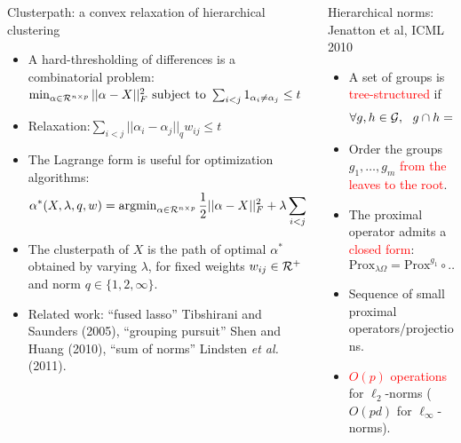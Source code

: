 \documentclass[final]{beamer}
\newcommand{\rred}[1]{{\textcolor{red}{#1}}}
\begin{document}
\begin{frame}{}
\begin{columns}[T]
\begin{column}{0.315\paperwidth}
\begin{block}{Clusterpath: a convex relaxation of hierarchical
    clustering}
\begin{itemize}
\item A hard-thresholding of differences is a combinatorial problem:
$
 \min_{    \alpha\in{\mathcal R}^{n\times p}}       ||\alpha-X||_F^2 \text{  subject to  }
\sum_{i<j}1_{\alpha_i\neq\alpha_j} \leq t$
\item Relaxation:$\sum_{i<j}||\alpha_i-\alpha_j||_q w_{ij}\leq t$
\item The Lagrange form is useful for optimization algorithms:
$$
\alpha^*(X,\lambda,q,w)=\operatorname{argmin}_{\alpha\in{\mathcal R}^{n\times p}}
\frac 1 2||\alpha-X||_F^2+\lambda\sum_{i<j}||\alpha_i-\alpha_j||_q w_{ij}
$$
\item The \alert<1>{clusterpath} of $X$ is the path of optimal
  $\alpha^*$ obtained by varying $\lambda$, for fixed weights
  $w_{ij}\in{\mathcal R}^+$ and norm $q\in\{1,2,\infty\}$.
\item
 Related work: ``fused lasso'' Tibshirani and Saunders (2005),
``grouping pursuit'' Shen and Huang (2010), ``sum of norms'' Lindsten
\emph{et al.}  (2011).
\end{itemize}


\end{block}


\end{column}\hfill

\begin{column}{0.315\linewidth}
\begin{block}{Hierarchical norms: Jenatton et al, ICML 2010} 
\begin{itemize}
   \item A set of groups is \rred{tree-structured} if $$\forall g,h \in {\mathcal G},~~ g \cap h = \emptyset ~~\text{or}~~ g \subset h ~~\text{or}~~ h \subset g.$$
   \item Order the groups $g_1,\ldots,g_m$ \rred{from the leaves to the root}.
   \item The proximal operator admits a \rred{closed form}: $$\text{Prox}_{\lambda\Omega} = \text{Prox}^{g_1} \circ \ldots \circ \text{Prox}^{g_m}.$$
   \item Sequence of small proximal operators/projections.
   \item \rred{$O(p)$ operations} for $\ell_2$-norms ($O(pd)$ for $\ell_\infty$-norms).
\end{itemize}
\end{block}


\end{column}
\end{columns}
\end{frame}
\end{document}
